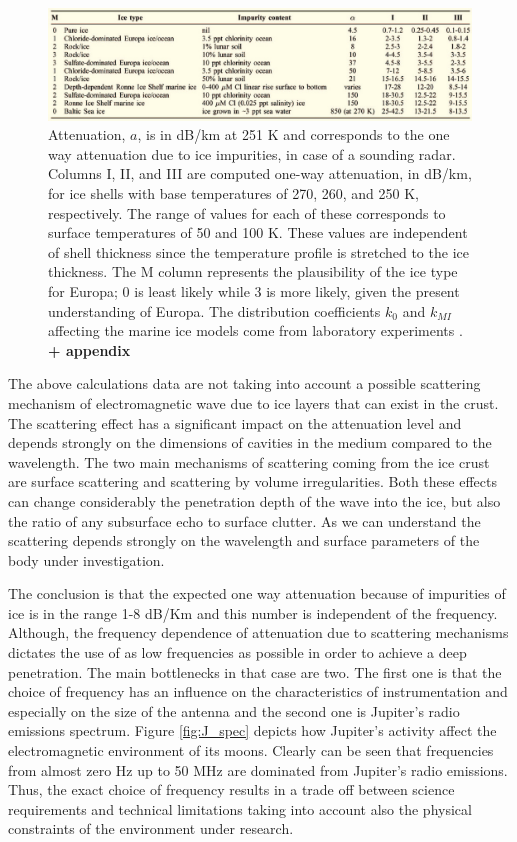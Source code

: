 \begin{figure}[htb]
\centering
\includegraphics[width=1\textwidth]{figures/Moore2.jpg}
\caption{Attenuation, $a$, is in dB/km at 251 K and corresponds to the one way attenuation due to  ice impurities, in case of a sounding radar. Columns I, II, and III are computed one-way attenuation, in dB/km, for ice shells with base temperatures of 270, 260, and 250 K, respectively. The range of values for each of these corresponds to surface temperatures of 50 and 100 K. These values are independent of shell thickness since the temperature profile is stretched to the ice thickness. The M column represents the plausibility of the ice type for Europa; 0 is least likely while 3 is more likely, given the present understanding
of Europa. The distribution coefficients $k_{0}$ and $k_{MI}$ affecting the marine ice models come from laboratory experiments \cite{Moore_2000}. \textbf{+ appendix}}
\label{fig:impurities}
\end{figure}
The above calculations data are not taking into account a possible scattering mechanism of electromagnetic wave due to ice layers that can exist in the crust. The scattering effect has a significant impact on the attenuation level and depends strongly on the dimensions of cavities in the medium compared to the wavelength. The two main mechanisms of scattering coming from the ice crust are surface scattering and scattering by volume irregularities. Both these effects can change considerably the penetration depth of the wave into the ice, but also the ratio of any subsurface echo to surface clutter. As we can understand the scattering depends strongly on the wavelength and surface parameters of the body under investigation. 

The conclusion is that the expected one way attenuation because of impurities of ice is in the range 1-8 dB/Km and this number is independent of the frequency. Although, the frequency dependence of attenuation due to scattering mechanisms dictates the use of as low frequencies as possible in order to achieve a deep penetration. The main bottlenecks in that case are two. The first one is that the choice of frequency has an influence on the characteristics of instrumentation and especially on the size of the antenna and the second one is Jupiter's radio emissions spectrum. Figure \ref{fig:J_spec} depicts how Jupiter's activity affect the electromagnetic environment of its moons. Clearly can be seen that frequencies from almost zero Hz up to 50 MHz are dominated from Jupiter's radio emissions. Thus, the exact choice of frequency results in a trade off between science requirements and technical limitations taking into account also the physical constraints of the environment under research. 

